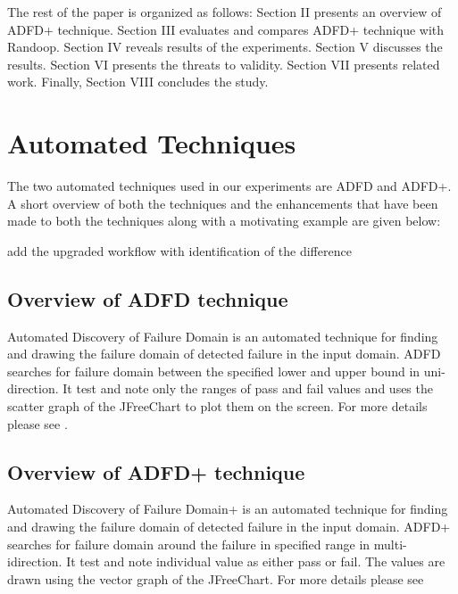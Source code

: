 \documentclass[conference]{IEEEtran}
\begin{document}






The rest of the paper is organized as follows: Section II presents an overview of ADFD+ technique. Section III evaluates and compares ADFD+ technique with Randoop. Section IV reveals results of the experiments. Section V discusses the results. Section VI presents the threats to validity. Section VII presents related work. Finally, Section VIII concludes the study.


 


\section{Automated Techniques}
The two automated techniques used in our experiments are ADFD and ADFD+. A short overview of both the techniques and the enhancements that have been made to both the techniques along with a motivating example are given below:


 add the upgraded workflow with identification of the difference 


\subsection{Overview of ADFD technique}
Automated Discovery of Failure Domain is an automated technique for finding and drawing the failure domain of detected failure in the input domain. ADFD searches for failure domain between the specified lower and upper bound in uni-direction. It test and note only the ranges of pass and fail values and uses the scatter graph of the JFreeChart to plot them on the screen. For more details please see \cite{}.

\subsection{Overview of ADFD+ technique}
Automated Discovery of Failure Domain+ is an automated technique for finding and drawing the failure domain of detected failure in the input domain. ADFD+ searches for failure domain around the failure in specified range in multi-idirection. It test and note individual value as either pass or fail. The values are drawn using the vector graph of the JFreeChart. For more details please see \cite{}
\end{document}
